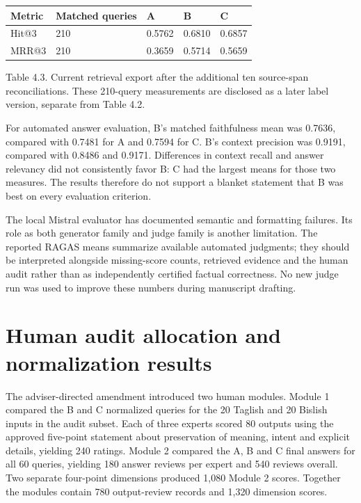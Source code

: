 {\small\begin{longtable}{@{}p{1.172in}p{1.172in}p{1.172in}p{1.172in}p{1.172in}@{}}\toprule

Metric & Matched queries & A & B & C \\ \midrule\endhead

Hit@3 & 210 & 0.5762 & 0.6810 & 0.6857 \\

MRR@3 & 210 & 0.3659 & 0.5714 & 0.5659 \\

\bottomrule\end{longtable}}

Table 4.3. Current retrieval export after the additional ten source-span reconciliations. These 210-query measurements are disclosed as a later label version, separate from Table 4.2.


For automated answer evaluation, B's matched faithfulness mean was 0.7636, compared with 0.7481 for A and 0.7594 for C. B's context precision was 0.9191, compared with 0.8486 and 0.9171. Differences in context recall and answer relevancy did not consistently favor B: C had the largest means for those two measures. The results therefore do not support a blanket statement that B was best on every evaluation criterion.


The local Mistral evaluator has documented semantic and formatting failures. Its role as both generator family and judge family is another limitation. The reported RAGAS means summarize available automated judgments; they should be interpreted alongside missing-score counts, retrieved evidence and the human audit rather than as independently certified factual correctness. No new judge run was used to improve these numbers during manuscript drafting.


\section{Human audit allocation and normalization results}

The adviser-directed amendment introduced two human modules. Module 1 compared the B and C normalized queries for the 20 Taglish and 20 Bislish inputs in the audit subset. Each of three experts scored 80 outputs using the approved five-point statement about preservation of meaning, intent and explicit details, yielding 240 ratings. Module 2 compared the A, B and C final answers for all 60 queries, yielding 180 answer reviews per expert and 540 reviews overall. Two separate four-point dimensions produced 1,080 Module 2 scores. Together the modules contain 780 output-review records and 1,320 dimension scores.



